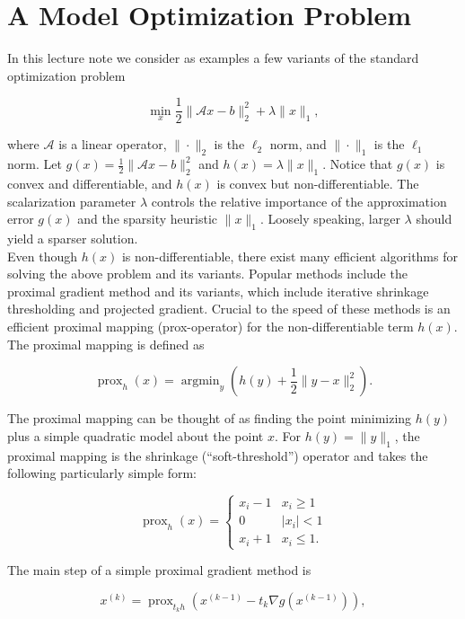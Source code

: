 \documentclass[journal]{IEEEtran}
\newcommand{\opn}[1]{\operatorname{#1}}
\begin{document}
\section{A Model Optimization Problem}
In this lecture note we consider as examples a few variants of the standard optimization problem

\begin{equation}
\label{eq:model_problem}
\min_x \frac{1}{2}\|\mathcal{A}x-b\|_2^2 + \lambda \|x\|_1,
\end{equation}

\noindent where $\mathcal{A}$ is a linear operator, $\|\cdot\|_2$ is the $\ell_2$ norm, and $\|\cdot\|_1$ is the $\ell_1$ norm. Let $g(x) = \frac{1}{2}\|\mathcal{A}x-b\|_2^2$ and $h(x)=\lambda \|x\|_1$.  Notice that $g(x)$ is convex and differentiable, and $h(x)$ is convex but non-differentiable.  The scalarization parameter $\lambda$ controls the relative importance of the approximation error $g(x)$ and the sparsity heuristic $\|x\|_1$.  Loosely speaking, larger $\lambda$ should yield a sparser solution.\\

Even though $h(x)$ is non-differentiable, there exist many efficient algorithms for solving the above problem and its variants.  Popular methods include the proximal gradient method and its variants, which include iterative shrinkage thresholding and projected gradient.  Crucial to the speed of these methods is an efficient proximal mapping (prox-operator) for the non-differentiable term $h(x)$.  The proximal mapping is defined as

\[ \opn{prox}_h(x) = \opn{argmin}_{y} \left(h(y) + \dfrac{1}{2}\|y-x\|_2^2\right). \] 

\noindent The proximal mapping can be thought of as finding the point minimizing $h(y)$ plus a simple quadratic model about the point $x$.  For $h(y) = \|y\|_1$, the proximal mapping is the shrinkage (``soft-threshold'') operator and takes the following particularly simple form:

\[ \opn{prox}_h(x) = \left\{\begin{array}{ll} x_i - 1 & x_i \ge 1\\ 0 & |x_i| < 1\\ x_i + 1 & x_i \le 1.\end{array}\right. \]

\noindent The main step of a simple proximal gradient method is

\[ x^{(k)} = \opn{prox}_{t_k h}\left(x^{(k-1)} - t_k \nabla g(x^{(k-1)})\right), \] 
\end{document}
